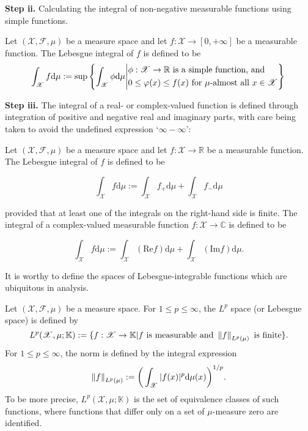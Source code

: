 \textbf{Step ii.} Calculating the integral of non-negative measurable functions using simple functions.
\begin{defn}
	Let $(\mathscr{X}, \mathscr{F}, \mu)$ be a measure space and let $f :  \mathscr{X} \to [0, + \infty]$ be a measurable
function. The Lebesgue integral of $f$ is defined to be
	\begin{equation*}
	\int_{\mathscr{X}} f \text{d}\mu := \sup \left\{ \int_{\mathscr{X}}\phi \text{d}\mu \middle\vert 
	\begin{aligned}
		& \phi : \mathscr{X} \to \mathbb{R} \text{ is a simple function, and} \\
		& 0 \leq \varphi(x) \leq f(x) \text{ for } \mu\text{-almost all } x \in \mathscr{X}
	\end{aligned}
	  \right \} \\
	\end{equation*}
\end{defn} 
\textbf{Step iii.} The integral of a real- or complex-valued function is defined through integration of
positive and negative real and imaginary parts, with care being taken to avoid the undefined
expression `$\infty - \infty$':
\begin{defn}
	Let $(\mathscr{X}, \mathscr{F}, \mu)$ be a measure space and let $f : \mathscr{X} \to \mathbb{R}$ be a measurable
function. The Lebesgue integral of $f$ is defined to be

	\begin{equation*}
		\int_{\mathscr{X}}f\text{d}\mu := \int_{\mathscr{X}}f_{+}\text{d}\mu + \int_{\mathscr{X}}f_{-}\text{d}\mu
	\end{equation*}

	provided that at least one of the integrals on the right-hand side is finite. The integral of a
complex-valued measurable function $f : \mathscr{X} \to \mathbb{C}$ is defined to be

	\begin{equation*}
		\int_{\mathscr{X}}f\text{d}\mu := \int_{\mathscr{X}}(\text{Re}f)\text{d}\mu + \int_{\mathscr{X}}(\text{Im}f)\text{d}\mu.
	\end{equation*}
\end{defn}
It is worthy to define the spaces of Lebesgue-integrable functions which are ubiquitous in analysis.
\begin{defn}
	Let $(\mathscr{X}, \mathscr{F}, \mu)$ be a measure space. For $1 \leq p \leq \infty$, the $L^p$ space (or
Lebesgue space) is defined by
	\begin{equation*}
		L^p(\mathscr{X}, \mu; \mathbb{K}) := \{f : \mathscr{X} \to \mathbb{K} \vert f \text{ is measurable and } \left\lVert f\right\rVert_{L^p(\mu)} \text{ is finite}\}.
	\end{equation*}
	For $1 \leq p \leq \infty$, the norm is defined by the integral expression
	\begin{equation}
		\left\lVert f\right\rVert_{L^p(\mu)} := \bigg( \int_{\mathscr{X}}\vert f(x) \vert^p\text{d}\mu(x) \bigg)^{1/p}.
	\end{equation}
	To be more precise, $	L^p(\mathscr{X}, \mu; \mathbb{K})$ is the set of equivalence classes of such functions, where
functions that differ only on a set of $\mu$-measure zero are identified.
\end{defn}

